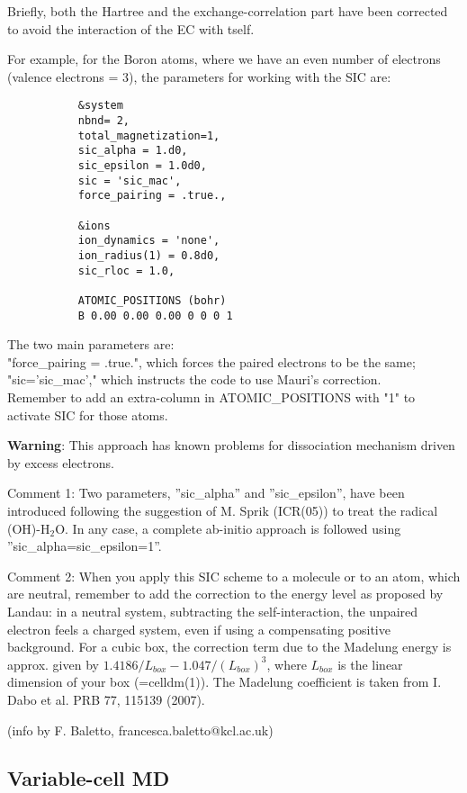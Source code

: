 \documentclass[12pt,a4paper]{article}
\begin{document}
Briefly, both the Hartree and the exchange-correlation part have been 
corrected to avoid the interaction of the EC with tself.

For example, for the Boron atoms, where we have an even number of 
electrons (valence electrons = 3), the parameters for working with
the SIC are:
\begin{verbatim}
           &system
           nbnd= 2,
           total_magnetization=1,
           sic_alpha = 1.d0,
           sic_epsilon = 1.0d0,
           sic = 'sic_mac',
           force_pairing = .true.,

           &ions
           ion_dynamics = 'none',
           ion_radius(1) = 0.8d0,
           sic_rloc = 1.0,

           ATOMIC_POSITIONS (bohr)
           B 0.00 0.00 0.00 0 0 0 1
\end{verbatim}
The two main parameters are:\\
"force\_pairing = .true.", which forces the paired electrons to be the same;\\ 
"sic='sic\_mac'," which instructs the code to use Mauri's correction.\\
Remember to add an extra-column in ATOMIC\_POSITIONS with "1" to activate
SIC for those atoms.

{\bf Warning}: 
This approach has known problems for dissociation mechanism
driven by excess electrons.

Comment 1:
Two parameters, ''sic\_alpha'' and ''sic\_epsilon'', have been introduced 
following the suggestion of M. Sprik (ICR(05)) to treat the radical
(OH)-H$_2$O. In any case, a complete ab-initio approach is followed 
using ''sic\_alpha=sic\_epsilon=1''.

Comment 2:
When you apply this SIC scheme to a molecule or to an atom, which are neutral,
remember to add the correction to the energy level as proposed by Landau: 
in a neutral system, subtracting the self-interaction, the unpaired electron
feels a charged system, even if using a compensating positive background. 
For a cubic box, the correction term due to the Madelung energy is approx. 
given by $1.4186/L_{box} - 1.047/(L_{box})^3$, where $L_{box}$ is the 
linear dimension of your box (=celldm(1)). The Madelung coefficient is 
taken from I. Dabo et al. PRB 77, 115139 (2007).

(info by F. Baletto, francesca.baletto@kcl.ac.uk)

\subsection{ Variable-cell MD }
\end{document}
